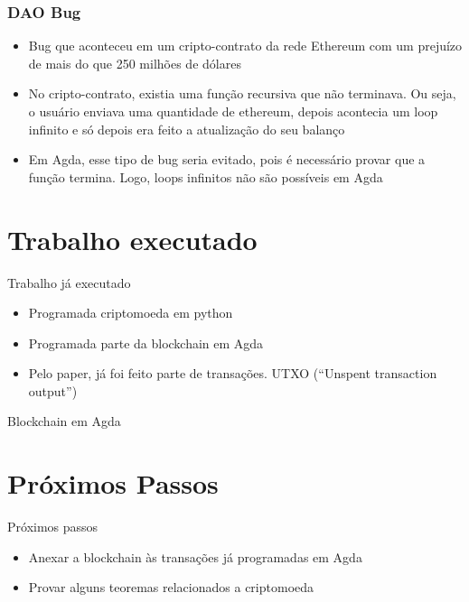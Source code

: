 \documentclass{beamer}
\begin{document}
\begin{frame}
  \frametitle{DAO Bug}
  \begin{itemize}
    \item Bug que aconteceu em um cripto-contrato da rede Ethereum com um prejuízo de mais do que 250 milhões de dólares
    \item No cripto-contrato, existia uma função recursiva que não terminava. Ou seja, o usuário enviava uma quantidade de ethereum, depois acontecia um loop infinito e só depois era feito a atualização do seu balanço
    \item Em Agda, esse tipo de bug seria evitado, pois é necessário provar que a função termina. Logo, loops infinitos não são possíveis em Agda
  \end{itemize}
\end{frame}

\section{Trabalho executado}

\begin{frame}{Trabalho já executado}
  \begin{itemize}
      \item Programada criptomoeda em python
      \item Programada parte da blockchain em Agda
      \item Pelo paper, já foi feito parte de transações. UTXO (\foreignquote{english}{Unspent transaction output})
  \end{itemize}
\end{frame}

\begin{frame}{Blockchain em Agda}
  \begin{adjustwidth}{-3.5em}{-2em} \fontsize{8}{11}
  \end{adjustwidth}
\end{frame}
  
\section{Próximos Passos}

\begin{frame}{Próximos passos}
  \begin{itemize}
    \item Anexar a blockchain às transações já programadas em Agda
    \item Provar alguns teoremas relacionados a criptomoeda
  \end{itemize}
\end{frame}
\end{document}
